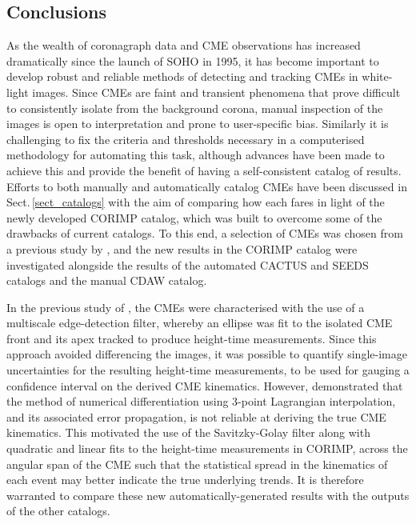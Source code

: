 \documentclass[referee,a4paper,12pt,traditabstract]{swsc}
\begin{document}
\begin{linenumbers}
\section{Conclusions}
\label{sect_conclusions}

As the wealth of coronagraph data and CME observations has increased dramatically since the launch of SOHO in 1995, it has become important to develop robust and reliable methods of detecting and tracking CMEs in white-light images. Since CMEs are faint and transient phenomena that prove difficult to consistently isolate from the background corona, manual inspection of the images is open to interpretation and prone to user-specific bias. Similarly it is challenging to fix the criteria and thresholds necessary in a computerised methodology for automating this task, although advances have been made to achieve this and provide the benefit of having a self-consistent catalog of results. Efforts to both manually and automatically catalog CMEs have been discussed in Sect.\,\ref{sect_catalogs} with the aim of comparing how each fares in light of the newly developed CORIMP catalog, which was built to overcome some of the drawbacks of current catalogs. To this end, a selection of CMEs was chosen from a previous study by \cite{2009A&A...495..325B}, and the new results in the CORIMP catalog were investigated alongside the results of the automated CACTUS and SEEDS catalogs and the manual CDAW catalog. 

In the previous study of \cite{2009A&A...495..325B}, the CMEs were characterised with the use of a multiscale edge-detection filter, whereby an ellipse was fit to the isolated CME front and its apex tracked to produce height-time measurements. Since this approach avoided differencing the images, it was possible to quantify single-image uncertainties for the resulting height-time measurements, to be used for gauging a confidence interval on the derived CME kinematics. However, \cite{2013A&A...557A..96B} demonstrated that the method of numerical differentiation using 3-point Lagrangian interpolation, and its associated error propagation, is not reliable at deriving the true CME kinematics. This motivated the use of the Savitzky-Golay filter along with quadratic and linear fits to the height-time measurements in CORIMP, across the angular span of the CME such that the statistical spread in the kinematics of each event may better indicate the true underlying trends. It is therefore warranted to compare these new automatically-generated results with the outputs of the other catalogs.


\end{linenumbers}
\end{document}
